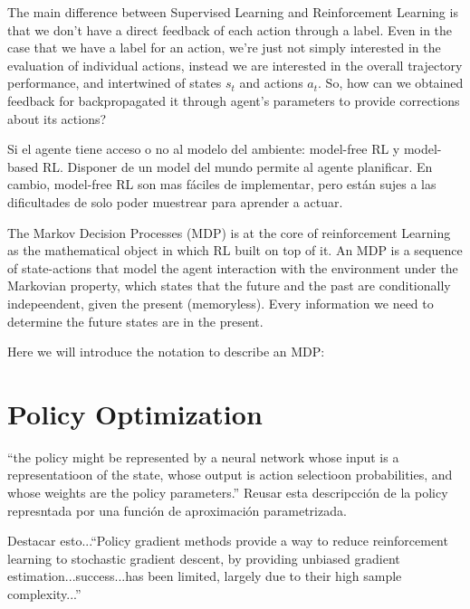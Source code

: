 
The main difference between Supervised Learning and Reinforcement Learning is that we don't have a direct feedback of each action through a label. Even in the case that we have a label for an action, we're just not simply interested in the evaluation of individual actions, instead we are interested in the overall trajectory performance, and intertwined of states $s_t$ and actions $a_t$. So, how can we obtained feedback for backpropagated it through agent's parameters to provide corrections about its actions?

Si el agente tiene acceso o no al modelo del ambiente: model-free RL y model-based RL. Disponer de un model del mundo permite al agente planificar. 
En cambio, model-free RL son mas fáciles de implementar, pero están
sujes a las dificultades de solo poder muestrear para aprender a 
actuar.

The Markov Decision Processes (MDP) is at the core of reinforcement Learning as the mathematical object in which RL built on top of it. An MDP is a sequence of state-actions that model the agent interaction with the environment under the Markovian property, which states that the future and the past are
conditionally indepeendent, given the present (memoryless). Every information we
need to determine the future states are in the present.

Here we will introduce the notation to describe an MDP:

\section{Policy Optimization}

 ``the policy might be represented by a neural network whose input is a representatioon of the state, whose output is action selectioon probabilities, and whose weights are the policy parameters.'' \cite{sutton1999policy} Reusar esta descripcción de la policy represntada por una función de aproximación parametrizada.

\noindent Destacar esto...``Policy gradient methods provide a way to reduce reinforcement learning to stochastic gradient descent, by providing unbiased gradient estimation...success...has been limited, largely due to their high sample complexity...''


